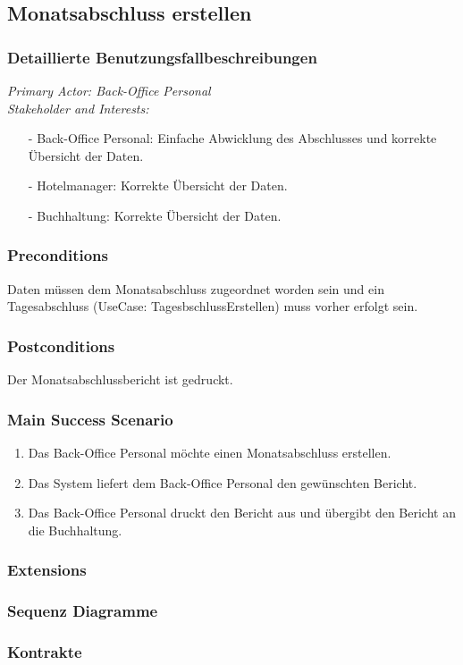 \documentclass[./detailed_overview_usecases.tex]{subfiles}
\begin{document}
    \subsection{Monatsabschluss erstellen}
    \subsubsection{Detaillierte Benutzungsfallbeschreibungen}
    \textit{Primary Actor: Back-Office Personal}
    \\
    \textit{Stakeholder and Interests:}
    \begin{itemize}
        \item[-] Back-Office Personal: Einfache Abwicklung des Abschlusses und korrekte Übersicht der Daten.
        \item[-] Hotelmanager: Korrekte Übersicht der Daten.
        \item[-] Buchhaltung: Korrekte Übersicht der Daten.
    \end{itemize}

    \subsubsection*{Preconditions}
    Daten müssen dem Monatsabschluss zugeordnet worden sein und ein Tagesabschluss (UseCase: TagesbschlussErstellen) muss vorher erfolgt sein.
    \subsubsection*{Postconditions}
    Der Monatsabschlussbericht ist gedruckt.

    \subsubsection*{Main Success Scenario}
    \begin{enumerate}
        \item Das Back-Office Personal möchte einen Monatsabschluss erstellen.
        \item Das System liefert dem Back-Office Personal den gewünschten Bericht.
        \item Das Back-Office Personal druckt den Bericht aus und übergibt den Bericht an die Buchhaltung.
    \end{enumerate}

    \subsubsection*{Extensions}
    \subsubsection{Sequenz Diagramme}
    \subsubsection{Kontrakte}
\end{document}
